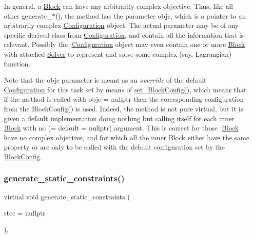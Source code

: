 In general, a \mbox{\hyperlink{class_s_m_spp__di__unipi__it_1_1_block}{Block}} can have any arbitrarily complex objective. Thus, like all other generate\+\_\+$\ast$(), the method has the parameter objc, which is a pointer to an arbitrarily complex \mbox{\hyperlink{class_s_m_spp__di__unipi__it_1_1_configuration}{Configuration}} object. The actual parameter may be of any specific derived class from \mbox{\hyperlink{class_s_m_spp__di__unipi__it_1_1_configuration}{Configuration}}, and contain all the information that is relevant. Possibly the \+:\mbox{\hyperlink{class_s_m_spp__di__unipi__it_1_1_configuration}{Configuration}} object may even contain one or more \mbox{\hyperlink{class_s_m_spp__di__unipi__it_1_1_block}{Block}} with attached \mbox{\hyperlink{class_s_m_spp__di__unipi__it_1_1_solver}{Solver}} to represent and solve some complex (say, Lagrangian) function.

Note that the objc parameter is meant as an {\itshape override} of the default \mbox{\hyperlink{class_s_m_spp__di__unipi__it_1_1_configuration}{Configuration}} for this task set by means of \mbox{\hyperlink{class_s_m_spp__di__unipi__it_1_1_block_a18d411b740a47db00d15083c5c7ef2ba}{set\+\_\+\+Block\+Config()}}, which means that if the method is called with objc = nullptr then the corresponding configuration from the Block\+Config() is used. Indeed, the method is not pure virtual, but it is given a default implementation doing nothing but calling itself for each inner \mbox{\hyperlink{class_s_m_spp__di__unipi__it_1_1_block}{Block}} with no (= default = nullptr) argument. This is correct for those \+:\mbox{\hyperlink{class_s_m_spp__di__unipi__it_1_1_block}{Block}} have no complex objective, and for which all the inner \mbox{\hyperlink{class_s_m_spp__di__unipi__it_1_1_block}{Block}} either have the same property or are only to be called with the default configuration set by the \mbox{\hyperlink{class_s_m_spp__di__unipi__it_1_1_block_config}{Block\+Config}}. \mbox{\label{class_s_m_spp__di__unipi__it_1_1_block_add9b4c918157bda66b5183f67953d49b}} 
\subsubsection{\texorpdfstring{generate\+\_\+static\+\_\+constraints()}{generate\_static\_constraints()}}
{\footnotesize\ttfamily virtual void generate\+\_\+static\+\_\+constraints (\begin{DoxyParamCaption}\item[{\mbox{\hyperlink{class_s_m_spp__di__unipi__it_1_1_configuration}{Configuration}} $\ast$}]{stcc = {\ttfamily nullptr} }\end{DoxyParamCaption})\hspace{0.3cm}{\ttfamily [inline]}, {\ttfamily [virtual]}}



